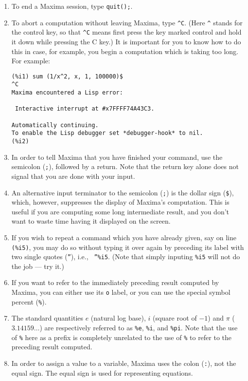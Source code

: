 \documentclass[a4paper,12pt]{article}
\begin{document}
\begin{enumerate}
\item To end a Maxima session, type {\tt quit();}.

\item To abort a computation without leaving Maxima, type \verb+^C+.
(Here \verb+^+ stands for the control key, so
that \verb+^C+ means first press the key marked control and hold it down while pressing the C key.)
It is important for you to
know how to do this in case, for example, you begin a computation which is taking too long.
For example:
\begin{verbatim}
(%i1) sum (1/x^2, x, 1, 100000)$
^C
Maxima encountered a Lisp error:

 Interactive interrupt at #x7FFFF74A43C3.

Automatically continuing.
To enable the Lisp debugger set *debugger-hook* to nil.
(%i2)
\end{verbatim}

\item In order to tell Maxima that you have finished your command, use
  the semicolon ({\tt ;}), followed by a return.  Note that the return
  key alone does not signal that you are done with your input.

\item An alternative input terminator to the semicolon ({\tt ;}) is
  the dollar sign ({\tt \$}), which, however, suppresses the display of
  Maxima's computation.  This is useful if you are computing some long
  intermediate result, and you don't want to waste time having it
  displayed on the screen.


\item If you wish to repeat a command which you have already given,
  say on line {\tt (\%i5)}, you may do so without typing it over again
  by preceding its label with two single quotes ({\tt ''}), i.e., {\tt
    ''\%i5}. (Note that simply inputing {\tt \%i5} will not do the job
  --- try it.)

\item If you want to refer to the immediately preceding result
  computed by Maxima, you can either use its {\tt o} label, or you can
  use the special symbol percent ({\tt \%}).

\item The standard quantities $e$ (natural log base), $i$ (square root
  of $-1$) and $\pi$ ($3.14159\ldots$) are respectively referred to as
  \verb+%e+, \verb+%i+,
  and \verb+%pi+.  Note that the use of {\tt \%} here as a prefix
  is completely unrelated to the use of {\tt \%} to refer to the
  preceding result computed.

\item In order to assign a value to a variable, Maxima uses the colon
  ({\tt :}), not the equal sign.  The equal sign is used for
  representing equations.
\end{enumerate}
\end{document}
